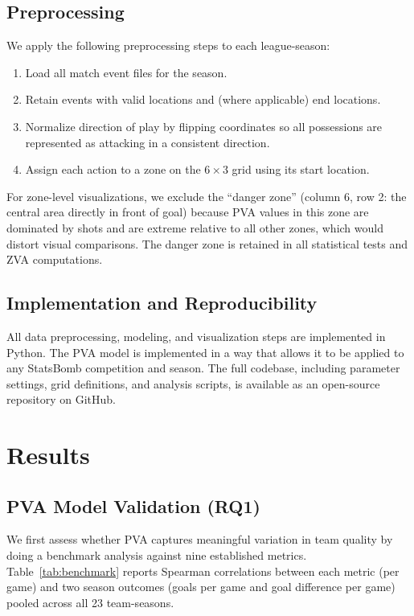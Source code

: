 \documentclass[12pt,a4paper]{article}
\begin{document}
\subsection{Preprocessing}
We apply the following preprocessing steps to each league-season:
\begin{enumerate}
    \item Load all match event files for the season.
    \item Retain events with valid locations and (where applicable) end locations.
    \item Normalize direction of play by flipping coordinates so all possessions are represented as attacking in a consistent direction.
    \item Assign each action to a zone on the $6 \times 3$ grid using its start location.
\end{enumerate}
For zone-level visualizations, we exclude the ``danger zone'' (column 6, row 2: the central area directly in front of goal) because PVA values in this zone are dominated by shots and are extreme relative to all other zones, which would distort visual comparisons. The danger zone is retained in all statistical tests and ZVA computations.

\subsection{Implementation and Reproducibility}
All data preprocessing, modeling, and visualization steps are implemented in Python. The PVA model is implemented in a way that allows it to be applied to any StatsBomb competition and season. The full codebase, including parameter settings, grid definitions, and analysis scripts, is available as an open-source repository on GitHub.

\section{Results}

\subsection{PVA Model Validation (RQ1)}

We first assess whether PVA captures meaningful variation in team quality by doing a benchmark analysis against nine established metrics. Table~\ref{tab:benchmark} reports Spearman correlations between each metric (per game) and two season outcomes (goals per game and goal difference per game) pooled across all 23 team-seasons.
\end{document}

